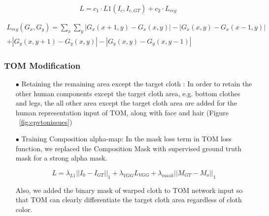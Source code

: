 \begin{itemize}


\begin{equation}
 L  = c_1 \cdot L1(I_c, I_{c,GT}) + c_2 \cdot  L_{reg}  
\end{equation}

\begin{equation}\label{eq:gridloss}
\begin{aligned}
 L_{reg} (G_x, G_y) = \sum_x \sum_y | G_x(x+1, y) - G_x(x, y) | - | G_x(x, y) - G_x(x-1, y) | \\
 + | G_y(x, y+1) - G_y(x, y) | - | G_y(x, y) - G_y(x, y-1) |
\end{aligned}
\end{equation}


\end{itemize}

\subsubsection{TOM Modification}


\begin{itemize}

\item[$\bullet$] Retaining the remaining area except the target cloth  :
In order to retain the other human components except the target cloth area, e.g. bottom clothes and legs, the all other area except the target cloth area are added for the human representation input of TOM, along with face and hair (Figure ~\ref{fig:cpvtonissues})

\item[$\bullet$] Training Composition alpha-map:  
In the mask loss term in TOM loss function, we replaced the Composition Mask with supervised ground truth mask for a strong alpha mask.

\begin{equation}
L = \lambda_{L1} || I_0-I_{GT}||_1+  \lambda_{VGG} L_{VGG} + \lambda_{mask} ||M_{GT}-M_o||_1       
\end{equation}

Also, we added the binary mask of warped cloth to TOM network input so that TOM can clearly differentiate the target cloth area regardless of cloth color.  


\end{itemize}



